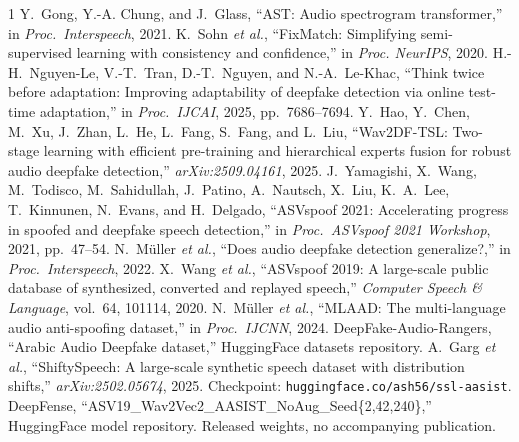 \documentclass[10pt,letterpaper]{article}
\begin{document}
{\begin{thebibliography}{1}
 Y.~Gong, Y.-A. Chung, and J.~Glass, ``AST: Audio spectrogram
transformer,'' in \emph{Proc.\ Interspeech}, 2021.
 K.~Sohn \emph{et al.}, ``FixMatch: Simplifying
semi-supervised learning with consistency and confidence,'' in
\emph{Proc. NeurIPS}, 2020.
 H.-H.~Nguyen-Le, V.-T.~Tran, D.-T.~Nguyen, and N.-A.~Le-Khac,
``Think twice before adaptation: Improving adaptability of deepfake detection
via online test-time adaptation,'' in \emph{Proc.\ IJCAI}, 2025, pp.\ 7686--7694.
 Y.~Hao, Y.~Chen, M.~Xu, J.~Zhan, L.~He, L.~Fang, S.~Fang,
and L.~Liu, ``Wav2DF-TSL: Two-stage learning with efficient pre-training and
hierarchical experts fusion for robust audio deepfake detection,''
\emph{arXiv:2509.04161}, 2025.
 J.~Yamagishi, X.~Wang, M.~Todisco, M.~Sahidullah,
J.~Patino, A.~Nautsch, X.~Liu, K.~A.~Lee, T.~Kinnunen, N.~Evans, and
H.~Delgado, ``ASVspoof 2021: Accelerating progress in spoofed and deepfake
speech detection,'' in \emph{Proc.\ ASVspoof 2021 Workshop}, 2021, pp.\ 47--54.
 N.~M\"uller \emph{et al.}, ``Does audio deepfake detection
generalize?,'' in \emph{Proc.\ Interspeech}, 2022.
 X.~Wang \emph{et al.}, ``ASVspoof 2019: A large-scale
public database of synthesized, converted and replayed speech,'' \emph{Computer
Speech \& Language}, vol.\ 64, 101114, 2020.
 N.~M\"uller \emph{et al.}, ``MLAAD: The multi-language audio
anti-spoofing dataset,'' in \emph{Proc.\ IJCNN}, 2024.
 DeepFake-Audio-Rangers, ``Arabic Audio Deepfake dataset,''
HuggingFace datasets repository.
 A.~Garg \emph{et al.}, ``ShiftySpeech: A large-scale
synthetic speech dataset with distribution shifts,'' \emph{arXiv:2502.05674},
2025. Checkpoint: \texttt{huggingface.co/ash56/ssl-aasist}.
 DeepFense, ``ASV19\_\-Wav2Vec2\_\-AASIST\_\-NoAug\_\-Seed\{2,42,240\},''
HuggingFace model repository. Released weights, no accompanying publication.
\end{thebibliography}}
\end{document}
